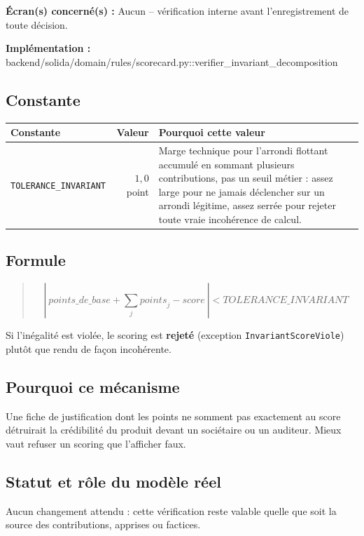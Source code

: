 \documentclass[11pt,a4paper]{article}
\newcommand{\brk}{\allowbreak}
\newcommand{\ecran}[1]{\noindent\textbf{Écran(s) concerné(s) :} #1\par}
\newcommand{\fichier}[1]{\noindent\textbf{Implémentation :} \tiny\ttfamily#1\normalfont\normalsize\par}
\newenvironment{formule}{\begin{quote}}{\end{quote}}
\begin{document}
\ecran{Aucun -- vérification interne avant l'enregistrement de toute décision.}
\fichier{backend/\brk solida/\brk domain/\brk rules/\brk scorecard.py::\brk{}verifier\_invariant\_decomposition}

\subsection*{Constante}

\begin{tabular}{@{}L{3.2cm}rL{7.4cm}@{}}
\toprule
Constante & Valeur & Pourquoi cette valeur \\
\midrule
\texttt{TOLERANCE\_\brk{}INVARIANT} & $1{,}0$ point & Marge technique pour l'arrondi
  flottant accumulé en sommant plusieurs contributions, pas un seuil métier : assez large pour
  ne jamais déclencher sur un arrondi légitime, assez serrée pour rejeter toute vraie
  incohérence de calcul. \\
\bottomrule
\end{tabular}

\subsection*{Formule}
\begin{formule}
\[
\left|\ \mathit{points\_de\_base} + \sum_j \mathit{points}_j - \mathit{score}\ \right| < \mathit{TOLERANCE\_INVARIANT}
\]
\end{formule}
Si l'inégalité est violée, le scoring est \textbf{rejeté} (exception \texttt{InvariantScoreViole})
plutôt que rendu de façon incohérente.

\subsection*{Pourquoi ce mécanisme}
Une fiche de justification dont les points ne somment pas exactement au score détruirait la
crédibilité du produit devant un sociétaire ou un auditeur. Mieux vaut refuser un scoring que
l'afficher faux.

\subsection*{Statut et rôle du modèle réel}
Aucun changement attendu : cette vérification reste valable quelle que soit la source des
contributions, apprises ou factices.

\newpage

\end{document}
